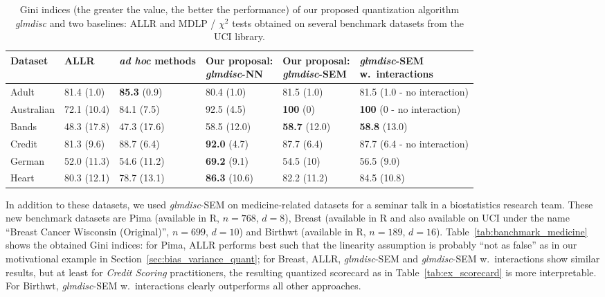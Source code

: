 \begin{table}
    \centering
        \caption{Gini indices (the greater the value, the better the performance) of our proposed quantization algorithm \textit{glmdisc} and two baselines: ALLR and MDLP / $\chi^2$ tests obtained on several benchmark datasets from the UCI library.}
    \label{tab:banchmark_inter}
\begin{small}
\begin{tabular}{llllll}
Dataset & ALLR & \textit{ad hoc} methods & \makecell{Our proposal:\\ \textit{glmdisc}-NN} & \makecell{Our proposal:\\ \textit{glmdisc}-SEM} & \makecell{\textit{glmdisc}-SEM\\ w.\ interactions} \\
\hline
Adult & 81.4 (1.0) & \textbf{85.3} (0.9) & 80.4 (1.0) & 81.5 (1.0) & 81.5 (1.0 - no interaction) \\
Australian & 72.1 (10.4) & 84.1 (7.5) & 92.5 (4.5) & \textbf{100} (0) & \textbf{100} (0 - no interaction) \\
Bands & 48.3 (17.8) & 47.3 (17.6) & 58.5 (12.0) & \textbf{58.7} (12.0) & \textbf{58.8} (13.0) \\
Credit & 81.3 (9.6) & 88.7 (6.4) & \textbf{92.0} (4.7) & 87.7 (6.4) & 87.7 (6.4 - no interaction) \\
German & 52.0 (11.3) & 54.6 (11.2) & \textbf{69.2} (9.1) & 54.5 (10) & 56.5 (9.0) \\
Heart & 80.3 (12.1) & 78.7 (13.1) & \textbf{86.3} (10.6) & 82.2 (11.2) & 84.5 (10.8)
\end{tabular}
\end{small}
\end{table}


In addition to these datasets, we used \textit{glmdisc}-SEM on medicine-related datasets for a seminar talk in a biostatistics research team. These new benchmark datasets are Pima (available in \textsf{R}, $n=768$, $d=8$), Breast (available in \textsf{R} and also available on UCI under the name ``Breast Cancer Wisconsin (Original)'', $n=699$, $d=10$) and Birthwt (available in \textsf{R}, $n=189$, $d=16$). Table~\ref{tab:banchmark_medicine} shows the obtained Gini indices: for Pima, ALLR performs best such that the linearity assumption is probably ``not as false'' as in our motivational example in Section~\ref{sec:bias_variance_quant}; for Breast, ALLR, \textit{glmdisc}-SEM and \textit{glmdisc}-SEM w.\ interactions show similar results, but at least for \textit{Credit Scoring} practitioners, the resulting quantized scorecard as in Table~\ref{tab:ex_scorecard} is more interpretable. For Birthwt, \textit{glmdisc}-SEM w.\ interactions clearly outperforms all other approaches.

